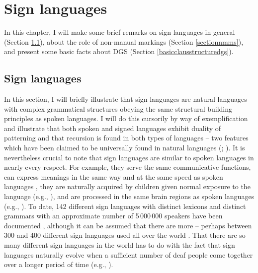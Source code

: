 \chapter{Sign languages}\label{chapterone}
In this chapter, I will make some brief remarks on sign languages in general (Section \ref{signlanguagesintro}), about the role of non-manual markings (Section \ref{sectionnmms}), and present some basic facts about DGS (Section \ref{basicclausstructuredgs}). 
%


\section{Sign languages}\label{signlanguagesintro}
In this section, I will briefly illustrate that sign languages are natural languages with complex grammatical structures obeying the same structural building principles as spoken languages. I will do this cursorily by way of exemplification and illustrate that both spoken and signed languages exhibit duality of patterning and that recursion is found in both types of languages -- two features which have been  claimed to be universally found in natural languages (\citealt{martinet1949double}; \citealt{hockett1960origin}). It is nevertheless crucial to note that sign languages are similar to spoken languages in nearly every respect. For example, they serve the same communicative functions, can express meanings in the same way and at the same speed as spoken languages \citep{bellugi1972comparison}, they are naturally acquired by children given normal exposure to the language (e.g., \citealt{newport1985acquisition}), and are processed in the same brain regions as spoken languages (e.g., \citealt{emmorey2002language}). To date, 142 different sign languages with distinct lexicons and distinct grammars with an approximate number of 5\,000\,000 speakers have been documented \citep{simons2018ethnologue}, although it can be assumed that there are more -- perhaps between 300 and 400 different sign languages used all over the world \citep{zeshan2009sign}. That there are so many different sign languages in the world has to do with the fact that sign languages naturally evolve when a sufficient number of deaf people come together over a longer period of time (e.g., \citealt{kegletal1999creation}).

